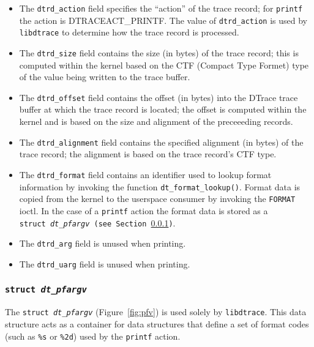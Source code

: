 \begin{itemize}

	\item The \texttt{dtrd\_action} field specifies the ``action'' of the
trace record; for \texttt{printf} the action is DTRACEACT\_PRINTF. The value of
\texttt{dtrd\_action} is used by \texttt{libdtrace} to determine how the trace
record is processed.

	\item The \texttt{dtrd\_size} field contains the size (in bytes) of the
trace record; this is computed within the kernel based on the CTF (Compact Type
Formet) type of the value being written to the trace buffer.

	\item The \texttt{dtrd\_offset} field contains the offset (in bytes)
into the DTrace trace buffer at which the trace record is located; the offset
is computed within the kernel and is based on the size and alignment of the
preceeeding records.

	\item The \texttt{dtrd\_alignment} field contains the specified
alignment (in bytes) of the trace record; the alignment is based on the trace
record's CTF type.

	\item The \texttt{dtrd\_format} field contains an identifier used to lookup
format information by invoking the function \texttt{dt\_format\_lookup()}.
Format data is copied from the kernel to the userspace consumer by invoking the
\texttt{FORMAT} ioctl. In the case of a \texttt{printf} action the format data
is stored as a \texttt{struct~\textit{dt\_pfargv} (see
Section~\ref{subsubsec:pfv})}. 

	\item The \texttt{dtrd\_arg} field is unused when printing.

	\item The \texttt{dtrd\_uarg} field is unused when printing.

\end{itemize}

\subsubsection{\texttt{struct~\textit{dt\_pfargv}}}
\label{subsubsec:pfv}

The \texttt{struct~\textit{dt\_pfargv}} (Figure~\ref{fig:pfv}) is used solely
by \texttt{libdtrace}. This data structure acts as a container for data
structures that define a set of format codes (such as \texttt{\%s} or
\texttt{\%2d}) used by the \texttt{printf} action.

